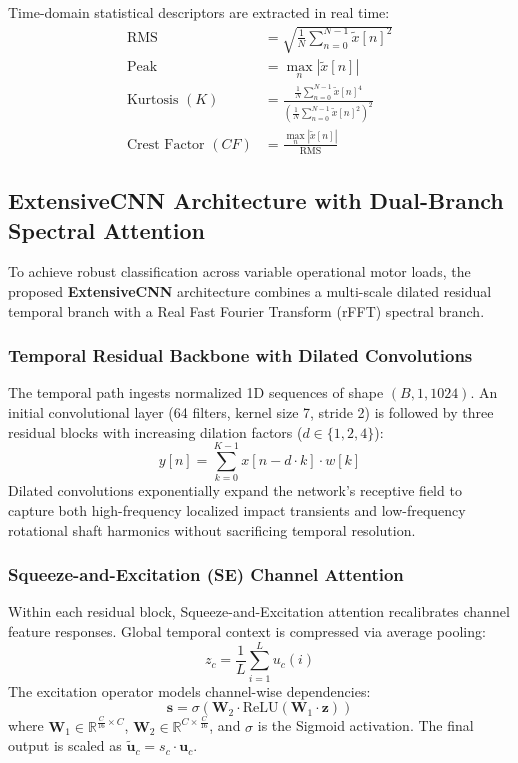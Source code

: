 \documentclass[10pt,journal,onecolumn]{IEEEtran}
\begin{document}
Time-domain statistical descriptors are extracted in real time:
\begin{align}
\text{RMS} &= \sqrt{\frac{1}{N}\sum_{n=0}^{N-1}\tilde{x}[n]^2} \\
\text{Peak} &= \max_n |\tilde{x}[n]| \\
\text{Kurtosis } (K) &= \frac{\frac{1}{N}\sum_{n=0}^{N-1}\tilde{x}[n]^4}{\left(\frac{1}{N}\sum_{n=0}^{N-1}\tilde{x}[n]^2\right)^2} \\
\text{Crest Factor } (CF) &= \frac{\max_n |\tilde{x}[n]|}{\text{RMS}}
\end{align}

\subsection{ExtensiveCNN Architecture with Dual-Branch Spectral Attention}
To achieve robust classification across variable operational motor loads, the proposed \textbf{ExtensiveCNN} architecture combines a multi-scale dilated residual temporal branch with a Real Fast Fourier Transform (rFFT) spectral branch.

\subsubsection{Temporal Residual Backbone with Dilated Convolutions}
The temporal path ingests normalized 1D sequences of shape $(B, 1, 1024)$. An initial convolutional layer (64 filters, kernel size 7, stride 2) is followed by three residual blocks with increasing dilation factors ($d \in \{1, 2, 4\}$):
\begin{equation}
y[n] = \sum_{k=0}^{K-1} x[n - d \cdot k] \cdot w[k]
\end{equation}
Dilated convolutions exponentially expand the network's receptive field to capture both high-frequency localized impact transients and low-frequency rotational shaft harmonics without sacrificing temporal resolution.

\subsubsection{Squeeze-and-Excitation (SE) Channel Attention}
Within each residual block, Squeeze-and-Excitation attention recalibrates channel feature responses. Global temporal context is compressed via average pooling:
\begin{equation}
z_c = \frac{1}{L}\sum_{i=1}^L u_c(i)
\end{equation}
The excitation operator models channel-wise dependencies:
\begin{equation}
\mathbf{s} = \sigma\left(\mathbf{W}_2 \cdot \text{ReLU}\left(\mathbf{W}_1 \cdot \mathbf{z}\right)\right)
\end{equation}
where $\mathbf{W}_1 \in \mathbb{R}^{\frac{C}{16}\times C}$, $\mathbf{W}_2 \in \mathbb{R}^{C \times \frac{C}{16}}$, and $\sigma$ is the Sigmoid activation. The final output is scaled as $\tilde{\mathbf{u}}_c = s_c \cdot \mathbf{u}_c$.
\end{document}

